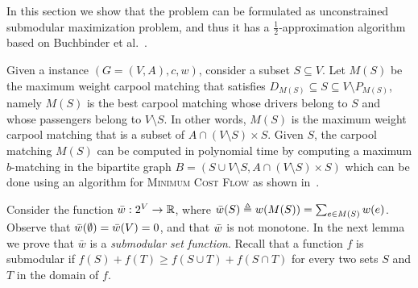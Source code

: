 
In this section we show that the \carpool problem can be formulated as
unconstrained submodular maximization problem, and thus it has a
$\frac{1}{2}$-approximation algorithm based on Buchbinder et
al.~\cite{BFNS15,buchbinder2016deterministic}.

Given a \carpool instance $(G = (V,A), c, w)$, consider a subset
$S \subseteq V$.  Let $M(S)$ be the maximum weight carpool matching
that satisfies $D_{M(S)} \subseteq S \subseteq V \setminus P_{M(S)}$,
namely $M(S)$ is the best carpool matching whose drivers belong to $S$
and whose passengers belong to $V \setminus S$.  In other words,
$M(S)$ is the maximum weight carpool matching that is a subset of
$A \cap (V \setminus S) \times S$.
%
Given $S$, the carpool matching $M(S)$ can be computed in polynomial
time by computing a maximum $b$-matching in the bipartite graph $B =
(S \cup V \setminus S, A \cap (V \setminus S) \times S)$ which can be
done using an algorithm for \textsc{Minimum Cost Flow} as shown
in~\cite{kutiel2016}.

Consider the function $\bar{w}: 2^V \to \mathbb{R}$, where $\bar{w}(S) \triangleq
w(M(S)) = \sum_{e \in M(S)} w(e)$.  Observe that $\bar{w}(\emptyset)
= \bar{w}(V) = 0$, and that $\bar{w}$ is not monotone.
%
In the next lemma we prove that $\bar{w}$ is a \emph{submodular set
function}.  Recall that a function $f$ is submodular if $f(S) +
f(T) \geq f(S \cup T) + f(S \cap T)$ for every two sets $S$ and $T$ in
the domain of $f$.


